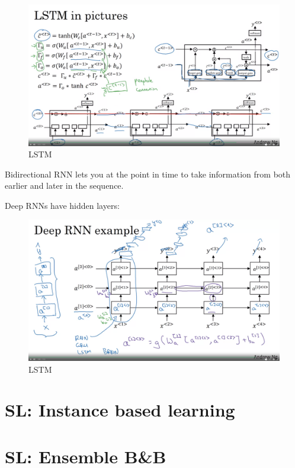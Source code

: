 \documentclass[12pt]{report}
\begin{document}
\begin{figure}[H]
  \centering
  \includegraphics[trim =0.0cm 0.0cm 0.0cm 0.0cm, clip, scale=0.15]{pics/LSTM.png}
  \caption{LSTM}
\end{figure}

Bidirectional RNN lets you at the point in time to take information from both earlier and later in the sequence.

Deep RNNs have hidden layers:
\begin{figure}[H]
  \centering
  \includegraphics[trim =0.0cm 0.0cm 0.0cm 0.0cm, clip, scale=0.15]{pics/DRNN.png}
  \caption{LSTM}
\end{figure}


\section{SL: Instance based learning}
\section{SL: Ensemble B\&B}
\end{document}
